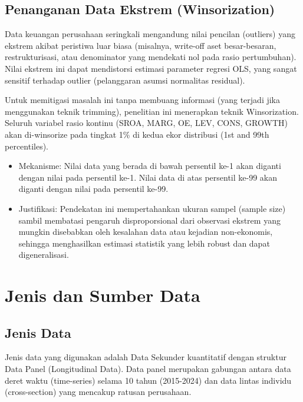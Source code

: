 \documentclass[12pt,a4paper]{report}
\providecommand{\tightlist}{%
  \setlength{\itemsep}{0pt}\setlength{\parskip}{0pt}%
}
\begin{document}
\hypertarget{penanganan-data-ekstrem-winsorization}{%
\subsection{Penanganan Data Ekstrem
(Winsorization)}\label{penanganan-data-ekstrem-winsorization}}

Data keuangan perusahaan seringkali mengandung nilai pencilan (outliers)
yang ekstrem akibat peristiwa luar biasa (misalnya, write-off aset
besar-besaran, restrukturisasi, atau denominator yang mendekati nol pada
rasio pertumbuhan). Nilai ekstrem ini dapat mendistorsi estimasi
parameter regresi OLS, yang sangat sensitif terhadap outlier
(pelanggaran asumsi normalitas residual).

Untuk memitigasi masalah ini tanpa membuang informasi (yang terjadi jika
menggunakan teknik trimming), penelitian ini menerapkan teknik
Winsorization. Seluruh variabel rasio kontinu (SROA, MARG, OE, LEV,
CONS, GROWTH) akan di-winsorize pada tingkat 1\% di kedua ekor
distribusi (1st and 99th percentiles).

\begin{itemize}
\tightlist
\item
  Mekanisme: Nilai data yang berada di bawah persentil ke-1 akan diganti
  dengan nilai pada persentil ke-1. Nilai data di atas persentil ke-99
  akan diganti dengan nilai pada persentil ke-99.
\item
  Justifikasi: Pendekatan ini mempertahankan ukuran sampel (sample size)
  sambil membatasi pengaruh disproporsional dari observasi ekstrem yang
  mungkin disebabkan oleh kesalahan data atau kejadian non-ekonomis,
  sehingga menghasilkan estimasi statistik yang lebih robust dan dapat
  digeneralisasi.
\end{itemize}

\hypertarget{jenis-dan-sumber-data}{%
\section{Jenis dan Sumber Data}\label{jenis-dan-sumber-data}}

\hypertarget{jenis-data}{%
\subsection{Jenis Data}\label{jenis-data}}

Jenis data yang digunakan adalah Data Sekunder kuantitatif dengan
struktur Data Panel (Longitudinal Data). Data panel merupakan gabungan
antara data deret waktu (time-series) selama 10 tahun (2015-2024) dan
data lintas individu (cross-section) yang mencakup ratusan perusahaan.
\end{document}
